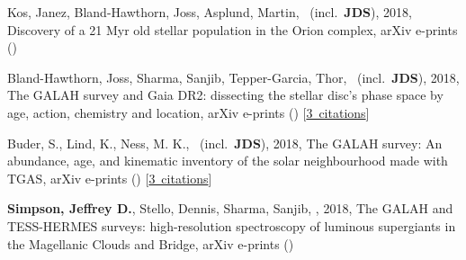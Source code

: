 \item[{\color{numcolor}\scriptsize4}] Kos, Janez, Bland-Hawthorn, Joss, Asplund, Martin, \etal\ (incl.\ \textbf{JDS}), 2018, Discovery of a 21 Myr old stellar population in the Orion complex, arXiv e-prints ()

\item[{\color{numcolor}\scriptsize3}] Bland-Hawthorn, Joss, Sharma, Sanjib, Tepper-Garcia, Thor, \etal\ (incl.\ \textbf{JDS}), 2018, The GALAH survey and Gaia DR2: dissecting the stellar disc's phase space by age, action, chemistry and location, arXiv e-prints () [\href{https://ui.adsabs.harvard.edu/#abs/2018arXiv180902658B}{3~citations}]

\item[{\color{numcolor}\scriptsize2}] Buder, S., Lind, K., Ness, M. K., \etal\ (incl.\ \textbf{JDS}), 2018, The GALAH survey: An abundance, age, and kinematic inventory of the solar neighbourhood made with TGAS, arXiv e-prints () [\href{https://ui.adsabs.harvard.edu/#abs/2018arXiv180405869B}{3~citations}]

\item[{\color{numcolor}\scriptsize1}] \textbf{Simpson, Jeffrey D.}, Stello, Dennis, Sharma, Sanjib, \etal, 2018, The GALAH and TESS-HERMES surveys: high-resolution spectroscopy of luminous supergiants in the Magellanic Clouds and Bridge, arXiv e-prints ()